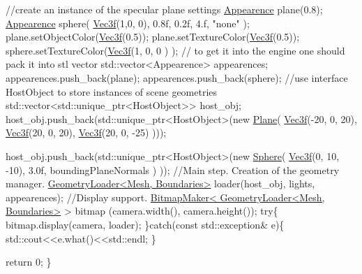 \begin{DoxyCode}
        \textcolor{comment}{//create an instance of the specular plane settings}
        \hyperlink{struct_appearence}{Appearence} plane(0.8);
        \hyperlink{struct_appearence}{Appearence} sphere( \hyperlink{class_vec3}{Vec3f}(1,0, 0), 0.8f, 0.2f, 4.f, \textcolor{stringliteral}{"none"} );
        plane.setObjectColor(\hyperlink{class_vec3}{Vec3f}(0.5));
        plane.setTextureColor(\hyperlink{class_vec3}{Vec3f}(0.5));
        sphere.setTextureColor(\hyperlink{class_vec3}{Vec3f}(1, 0, 0 ) );
        \textcolor{comment}{// to get it into the engine one should pack it into stl vector}
        std::vector<Appearence>  appearences;
        appearences.push\_back(plane);
        appearences.push\_back(sphere);
        \textcolor{comment}{//use interface HostObject to store instances of scene geometries}
        std::vector<std::unique\_ptr<HostObject>> host\_obj;
        host\_obj.push\_back(std::unique\_ptr<HostObject>(\textcolor{keyword}{new} \hyperlink{class_plane}{Plane}( \hyperlink{class_vec3}{Vec3f}(-20, 0, 20), 
      \hyperlink{class_vec3}{Vec3f}(20, 0, 20), \hyperlink{class_vec3}{Vec3f}(20, 0, -25) )));

        host\_obj.push\_back(std::unique\_ptr<HostObject>(\textcolor{keyword}{new} \hyperlink{class_sphere}{Sphere}( \hyperlink{class_vec3}{Vec3f}(0, 10, -10), 3.0f, 
      boundingPlaneNormals )   ));
        \textcolor{comment}{//Main step. Creation of the geometry manager.}
        \hyperlink{class_geometry_loader}{GeometryLoader<Mesh, Boundaries>} loader(host\_obj, lights, 
      appearences);
        \textcolor{comment}{//Display support.}
        \hyperlink{class_bitmap_maker}{BitmapMaker< GeometryLoader<Mesh, Boundaries>} > bitmap
      (camera.width(), camera.height());
        \textcolor{keywordflow}{try}\{
            bitmap.display(camera, loader);
        \}\textcolor{keywordflow}{catch}(\textcolor{keyword}{const} std::exception& e)\{
            std::cout<<e.what()<<std::endl;
        \}

        \textcolor{keywordflow}{return} 0;
\}
\end{DoxyCode}
 
